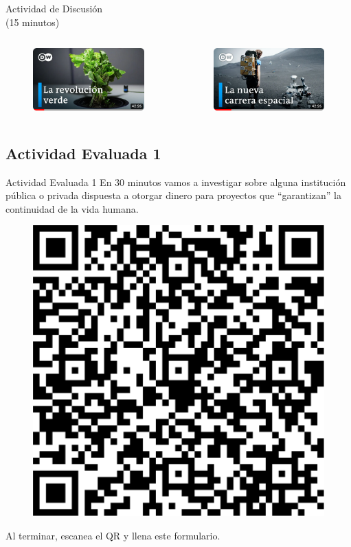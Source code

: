 \documentclass[aspectratio=169]{beamer}
\begin{document}
\begin{frame}
\centering
Actividad de Discusión\\
(15 minutos)
\begin{columns}
\begin{column}{0.5\textwidth}
\begin{figure}
\includegraphics[width=.55\textwidth]{verde.png}
\end{figure}   
\end{column}
\begin{column}{0.5\textwidth}
\begin{figure}
\includegraphics[width=.55\textwidth]{negro.png}
\end{figure}   
\end{column}
\end{columns}
\end{frame}


\subsection{Actividad Evaluada 1}
\begin{frame}{Actividad Evaluada 1}
\centering
En 30 minutos vamos a investigar sobre alguna institución pública o privada dispuesta a otorgar dinero para proyectos que ``garantizan'' la continuidad de la vida humana.\\
\begin{figure}
\includegraphics[width=.2\textwidth]{ActEvaluada.png}
\end{figure}
Al terminar, escanea el QR y llena este formulario.
\end{frame}
\end{document}
